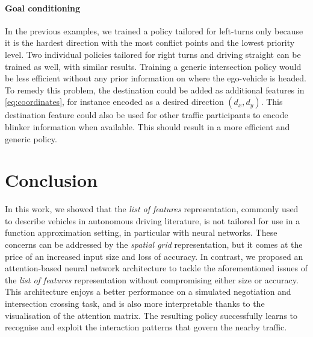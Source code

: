 \documentclass{article}
\begin{document}
\paragraph{Goal conditioning}

In the previous examples, we trained a policy tailored for left-turns only because it is the hardest direction with the most conflict points and the lowest priority level. Two individual policies tailored for right turns and driving straight can be trained as well, with similar results. Training a generic intersection policy would be less efficient without any prior information on where the ego-vehicle is headed. To remedy this problem, the destination could be added as additional features in \eqref{eq:coordinates}, for instance encoded as a desired direction $(d_x, d_y)$. This destination feature could also be used for other traffic participants to encode blinker information when available. This should result in a more efficient and generic policy.

\section{Conclusion}

In this work, we showed that the \emph{list of features} representation, commonly used to describe vehicles in autonomous driving literature, is not tailored for use in a function approximation setting, in particular with neural networks. These concerns can be addressed by the \emph{spatial grid} representation, but it comes at the price of an increased input size and loss of accuracy. In contrast, we proposed an attention-based neural network architecture to tackle the aforementioned issues of the \emph{list of features} representation without compromising either size or accuracy. This architecture enjoys a better performance on a simulated negotiation and intersection crossing task, and is also more interpretable thanks to the visualisation of the attention matrix. The resulting policy successfully learns to recognise and exploit the interaction patterns that govern the nearby traffic.

%



\end{document}
